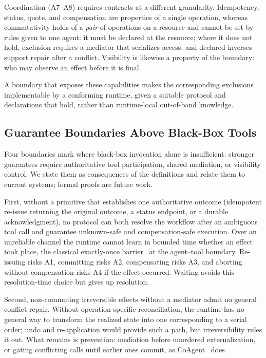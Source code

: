 \documentclass{article}
\begin{document}
Coordination (A7--A8) requires contracts at a different granularity.
Idempotency, status, quote, and compensation are properties of a single
operation, whereas commutativity holds of a \emph{pair} of operations on a
resource and cannot be set by rules given to one agent: it must be declared
at the resource; where it does not hold, exclusion requires a mediator that
serializes access, and declared inverses support repair after a conflict. Visibility is likewise a property of the boundary:
who may observe an effect before it is final.

A boundary that exposes these capabilities makes the corresponding
exclusions implementable by a conforming runtime, given a suitable protocol
and declarations that hold, rather than runtime-local out-of-band
knowledge.

\subsection{Guarantee Boundaries Above Black-Box Tools}
\label{sec:boundaries}

Four boundaries mark where black-box invocation alone is insufficient:
stronger guarantees require authoritative tool participation, shared
mediation, or visibility control. We state them as consequences of the
definitions and relate them to current systems; formal proofs are future
work.

First, without a primitive that establishes one authoritative outcome (idempotent re-issue returning the original outcome, a status endpoint, or a durable acknowledgment), no protocol can both resolve the workflow after
an ambiguous tool call and guarantee unknown-safe and compensation-safe
execution. Over an unreliable channel the runtime cannot learn in bounded
time whether an effect took place, the classical exactly-once
barrier~\cite{bernstein1987concurrency} at the agent--tool boundary.
Re-issuing risks A1, committing risks A2, compensating risks A3, and
aborting without compensation risks A4 if the effect occurred. Waiting
avoids this resolution-time choice but gives up resolution.

Second, non-commuting irreversible effects without a mediator admit no
general conflict repair. Without operation-specific reconciliation, the
runtime has no general way to transform the realized state into one
corresponding to a serial order; undo and re-application would provide such
a path, but irreversibility rules it out. What
remains is prevention: mediation before unordered externalization, or gating
conflicting calls until earlier ones commit, as
CoAgent~\cite{lyu2026coagent} does.
\end{document}
